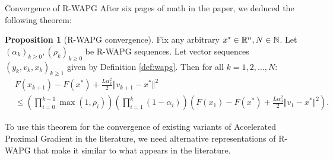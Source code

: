 \documentclass[11pt]{beamer}
\theoremstyle{definition}
\newtheorem{proposition}{Proposition}[section]
\begin{document}
        \begin{frame}{Convergence of R-WAPG}
            After six pages of math in the paper, we deduced the following theorem: 
            \begin{proposition}[R-WAPG convergence]\label{prop:wapg-convergence}
                Fix any arbitrary $x^* \in \mathbb R^n, N \in \mathbb N$.
                Let $(\alpha_k)_{k \ge 0}, (\rho_k)_{k \ge 0}$ be R-WAPG sequences.
                Let vector sequences $(y_k, v_{k}, x_{k})_{k \ge 1}$ given by Definition \ref{def:wapg}. 
                Then for all $k = 1, 2, \ldots, N$:
                {\small
                \begin{align*}
                    & F(x_{k + 1}) - F(x^*) + \frac{L \alpha_k^2}{2}\Vert v_{k + 1} - x^*\Vert^2
                    \\
                    &\le
                    \left(
                        \prod_{i = 0}^{k - 1} \max(1, \rho_{i})
                    \right)
                    \left(
                        \prod_{i = 1}^{k} \left(1  - \alpha_i\right)
                    \right)
                    \left(
                        F(x_1) - F(x^*) + \frac{L\alpha_0^2}{2}\Vert v_1 - x^*\Vert^2
                    \right).
                \end{align*}
                }
            \end{proposition}
            To use this theorem for the convergence of existing variants of Accelerated Proximal Gradient in the literature, we need alternative representations of R-WAPG that make it similar to what appears in the literature. 
        \end{frame}
\end{document}
